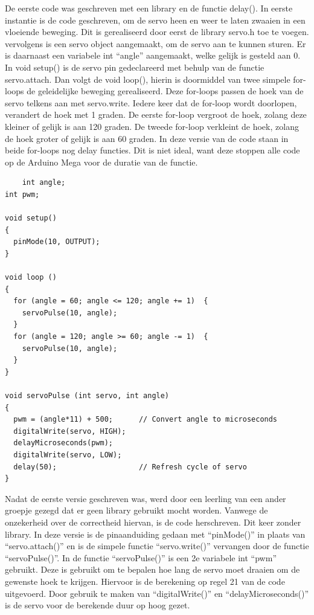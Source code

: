 De eerste code was geschreven met een library en de functie delay(). In eerste instantie is de code geschreven, om de servo heen en weer te laten zwaaien in een vloeiende beweging. Dit is gerealiseerd door eerst de library servo.h toe te voegen. vervolgens is een servo object aangemaakt, om de servo aan te kunnen sturen. Er is daarnaast een variabele int “angle” aangemaakt, welke gelijk is gesteld aan 0.  In void setup() is de servo pin gedeclareerd met behulp van de functie servo.attach. 
Dan volgt de void loop(), hierin is doormiddel van twee simpele for-loops de geleidelijke beweging gerealiseerd. Deze for-loops passen de hoek van de servo telkens aan met servo.write. Iedere keer dat de for-loop wordt doorlopen, verandert de hoek met 1 graden. De eerste for-loop vergroot de hoek, zolang deze kleiner of gelijk is aan 120 graden. De tweede for-loop verkleint de hoek, zolang de hoek groter of gelijk is aan 60 graden. In deze versie van de code staan in beide for-loops nog delay functies. Dit is niet ideal, want deze stoppen alle code op de Arduino Mega\cite{ArduinoMEGA} voor de duratie van de functie. 

\begin{lstlisting}
    int angle;
int pwm;

void setup()
{
  pinMode(10, OUTPUT);
}

void loop ()
{
  for (angle = 60; angle <= 120; angle += 1)  {
    servoPulse(10, angle);  
  }
  for (angle = 120; angle >= 60; angle -= 1)  {
    servoPulse(10, angle); 
  }
}
  
void servoPulse (int servo, int angle)
{
  pwm = (angle*11) + 500;      // Convert angle to microseconds
  digitalWrite(servo, HIGH);
  delayMicroseconds(pwm);
  digitalWrite(servo, LOW);
  delay(50);                   // Refresh cycle of servo
}
\end{lstlisting}

Nadat de eerste versie geschreven was, werd door een leerling van een ander groepje gezegd dat er geen library gebruikt mocht worden. Vanwege de onzekerheid over de correctheid hiervan, is de code herschreven.  Dit keer zonder library\cite{Aansturen-servo-zonder-library}. In deze versie is de pinaanduiding gedaan met “pinMode()” in plaats van “servo.attach()” en is de simpele functie “servo.write()” vervangen door de functie “servoPulse()”. In de functie “servoPulse()” is een 2e variabele int “pwm” gebruikt. Deze is gebruikt om te bepalen hoe lang de servo moet draaien om de gewenste hoek te krijgen. Hiervoor is de berekening op regel 21 van de code uitgevoerd. Door gebruik te maken van “digitalWrite()” en “delayMicroseconds()” is de servo voor de berekende duur op hoog gezet. 

